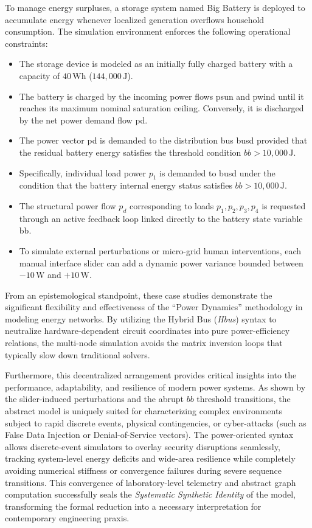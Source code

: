 \documentclass[11pt, a4paper]{article}
\begin{document}
To manage energy surpluses, a storage system named \textsf{Big Battery} is deployed to accumulate energy whenever localized generation overflows household consumption. The simulation environment enforces the following operational constraints:
\begin{itemize}
    \item The storage device is modeled as an initially fully charged battery with a capacity of $40\,\text{Wh}$ ($144,000\,\text{J}$).
    \item The battery is charged by the incoming power flows \textsf{psun} and \textsf{pwind} until it reaches its maximum nominal saturation ceiling. Conversely, it is discharged by the net power demand flow \textsf{pd}.
    \item The power vector \textsf{pd} is demanded to the distribution bus \textsf{busd} provided that the residual battery energy satisfies the threshold condition $bb > 10,000\,\text{J}$.
    \item Specifically, individual load power $p_1$ is demanded to \textsf{busd} under the condition that the battery internal energy status satisfies $bb > 10,000\,\text{J}$.
    \item The structural power flow $p_d$ corresponding to loads $p_1, p_2, p_3, p_4$ is requested through an active feedback loop linked directly to the battery state variable \textsf{bb}.
    \item To simulate external perturbations or micro-grid human interventions, each manual interface slider can add a dynamic power variance bounded between $-10\,\text{W}$ and $+10\,\text{W}$.
\end{itemize}

From an epistemological standpoint, these case studies demonstrate the significant flexibility and effectiveness of the ``Power Dynamics'' methodology in modeling energy networks. By utilizing the Hybrid Bus (\textit{Hbus}) syntax to neutralize hardware-dependent circuit coordinates into pure power-efficiency relations, the multi-node simulation avoids the matrix inversion loops that typically slow down traditional solvers.

Furthermore, this decentralized arrangement provides critical insights into the performance, adaptability, and resilience of modern power systems. As shown by the slider-induced perturbations and the abrupt $bb$ threshold transitions, the abstract model is uniquely suited for characterizing complex environments subject to rapid discrete events, physical contingencies, or cyber-attacks (such as False Data Injection or Denial-of-Service vectors). The power-oriented syntax allows discrete-event simulators to overlay security disruptions seamlessly, tracking system-level energy deficits and wide-area resilience while completely avoiding numerical stiffness or convergence failures during severe sequence transitions. This convergence of laboratory-level telemetry and abstract graph computation successfully seals the \textit{Systematic Synthetic Identity} of the model, transforming the formal reduction into a necessary interpretation for contemporary engineering praxis.
\end{document}
